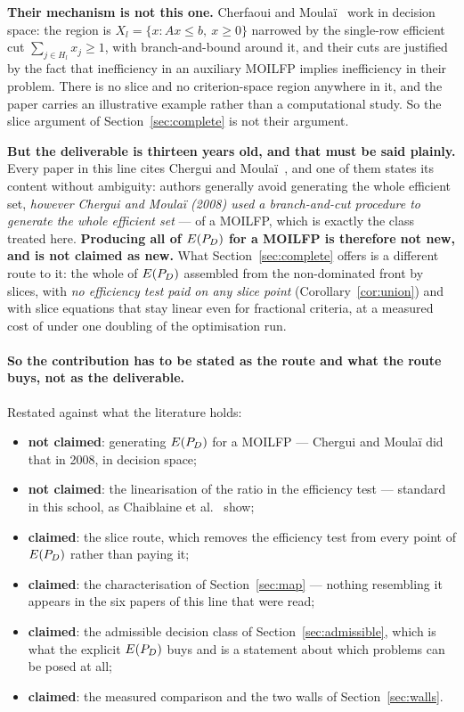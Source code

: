 \documentclass[11pt,a4paper]{article}
\begin{document}
\textbf{Their mechanism is not this one.}  Cherfaoui and
Moula\"i~\cite{cherfaoui2021} work in decision space: the region is
$X_l = \{x : Ax \leqslant b,\ x \geqslant 0\}$ narrowed by the single-row
efficient cut $\sum_{j \in H_l} x_j \geqslant 1$, with branch-and-bound
around it, and their cuts are justified by the fact that inefficiency in an
auxiliary MOILFP implies inefficiency in their problem.  There is no slice
and no criterion-space region anywhere in it, and the paper carries an
illustrative example rather than a computational study.  So the slice
argument of Section~\ref{sec:complete} is not their argument.

\textbf{But the deliverable is thirteen years old, and that must be said
plainly.}  Every paper in this line cites Chergui and
Moula\"i~\cite{cherguimoulai2008}, and one of them states its content
without ambiguity: authors generally avoid generating the whole efficient
set, \emph{however Chergui and Moula\"i (2008) used a branch-and-cut
procedure to generate the whole efficient set} --- of a MOILFP, which is
exactly the class treated here.  \textbf{Producing all of $E(P_{D})$ for a MOILFP
is therefore not new, and is not claimed as new.}  What Section~\ref{sec:complete}
offers is a different route to it: the whole of $E(P_{D})$ assembled from the
non-dominated front by slices, with \emph{no efficiency test paid on any
slice point} (Corollary~\ref{cor:union}) and with slice equations that stay
linear even for fractional criteria, at a measured cost of under one
doubling of the optimisation run.

\paragraph{So the contribution has to be stated as the route and what the
route buys, not as the deliverable.}
Restated against what the literature holds:

\begin{itemize}
\item \textbf{not claimed}: generating $E(P_{D})$ for a MOILFP --- Chergui and
      Moula\"i did that in 2008, in decision space;
\item \textbf{not claimed}: the linearisation of the ratio in the efficiency
      test --- standard in this school, as Chaiblaine
      et al.~\cite{chaiblaine2020} show;
\item \textbf{claimed}: the slice route, which removes the efficiency test
      from every point of $E(P_{D})$ rather than paying it;
\item \textbf{claimed}: the characterisation of
      Section~\ref{sec:map} --- nothing resembling it appears in the six
      papers of this line that were read;
\item \textbf{claimed}: the admissible decision class of
      Section~\ref{sec:admissible}, which is what the explicit $E(P_{D})$ buys and
      is a statement about which problems can be posed at all;
\item \textbf{claimed}: the measured comparison and the two walls of
      Section~\ref{sec:walls}.
\end{itemize}
\end{document}
